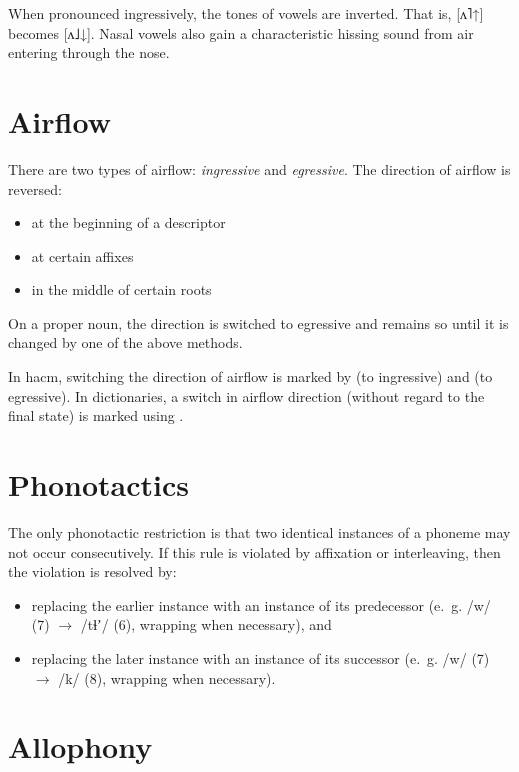 \documentclass{book}
\begin{document}
When pronounced ingressively, the tones of vowels are inverted. That is, [ʌ˥↑] becomes [ʌ˩↓]. Nasal vowels also gain a characteristic hissing sound from air entering through the nose.

\section{Airflow}


There are two types of airflow: \emph{ingressive} and \emph{egressive}. The direction of airflow is reversed:

\begin{itemize}
  \item at the beginning of a descriptor
  \item at certain affixes
  \item in the middle of certain roots
\end{itemize}

On a proper noun, the direction is switched to egressive and remains so until it is changed by one of the above methods.

In hacm, switching the direction of airflow is marked by \hortho{/} (to ingressive) and \hortho{\bs} (to egressive). In dictionaries, a switch in airflow direction (without regard to the final state) is marked using \hortho{>}.

\section{Phonotactics}

The only phonotactic restriction is that two identical instances of a phoneme may not occur consecutively. If this rule is violated by affixation or interleaving, then the violation is resolved by:

\begin{itemize}
  \item replacing the earlier instance with an instance of its predecessor (e.~g. /w/ (7) $\rightarrow$ /tɬʼ/ (6), wrapping when necessary), and
  \item replacing the later instance with an instance of its successor (e.~g. /w/ (7) $\rightarrow$ /k/ (8), wrapping when necessary).
\end{itemize}

\section{Allophony}
\end{document}
